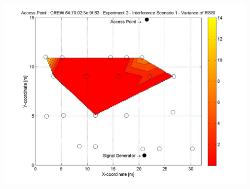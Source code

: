 \documentclass[11pt,a4paper,headinclude,footinclude,chapterprefix=on]{scrreprt}
\begin{document}
\begin{longtable}
	\includegraphics[width=13cm]{../../Source/plot/CREW_63/63_Sig_Ex_2_Variance.jpg} \\
\end{longtable}
\end{document}
